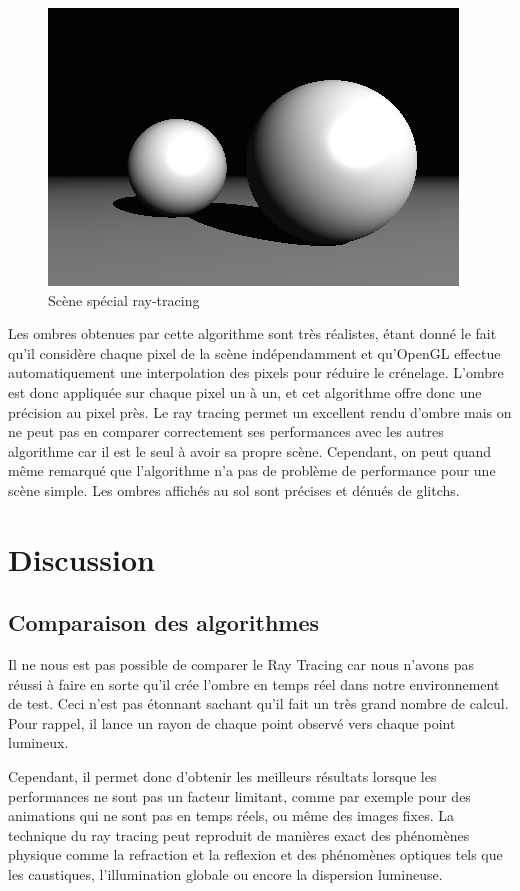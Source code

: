 \documentclass[a4paper,10pt]{report}
\begin{document}
\begin{figure}[H]
\includegraphics[scale=0.4]{images/raytracing.png}
\centering
\caption{Scène spécial ray-tracing}
\end{figure}

Les ombres obtenues par cette algorithme sont très réalistes, étant donné le fait qu'il considère chaque pixel de la scène indépendamment et qu'OpenGL effectue automatiquement une interpolation des pixels pour réduire le crénelage. L'ombre est donc appliquée sur chaque pixel un à un, et cet algorithme offre donc une précision au pixel près. Le ray tracing permet un excellent rendu d'ombre mais on ne peut pas en comparer correctement ses performances avec les autres algorithme car il est le seul à avoir sa propre scène. Cependant, on peut quand m\^eme remarqué que l'algorithme n'a pas de problème de performance pour une scène simple. Les ombres affichés au sol sont précises et dénués de glitchs.


\chapter{Discussion}

\section{Comparaison des algorithmes}

Il ne nous est pas possible de comparer le Ray Tracing car nous n'avons pas réussi à faire en sorte qu'il crée l'ombre en temps réel dans notre environnement de test. Ceci n'est pas étonnant sachant qu'il fait un très grand nombre de calcul. Pour rappel, il lance un rayon de chaque point observé vers chaque point lumineux.

Cependant, il permet donc d'obtenir les meilleurs résultats lorsque les performances ne sont pas un facteur limitant, comme par exemple pour des animations qui ne sont pas en temps réels, ou même des images fixes. La technique du ray tracing peut reproduit de manières exact des phénomènes physique comme la refraction et la reflexion et des phénomènes optiques tels que les caustiques, l'illumination globale ou encore la dispersion lumineuse.
\end{document}
